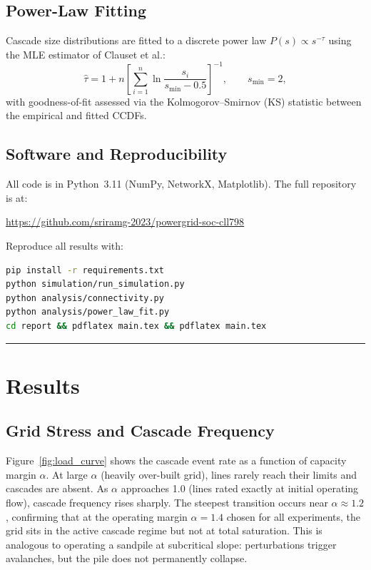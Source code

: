 \documentclass[12pt,a4paper]{article}
\begin{document}
\subsection{Power-Law Fitting}

Cascade size distributions are fitted to a discrete power law
$P(s) \propto s^{-\tau}$ using the MLE estimator of Clauset et al.:
\begin{equation}
    \hat{\tau} = 1 + n \left[
    \sum_{i=1}^{n} \ln \frac{s_i}{s_\text{min} - 0.5}
    \right]^{-1}, \qquad s_\text{min} = 2,
    \label{eq:mle}
\end{equation}
with goodness-of-fit assessed via the Kolmogorov--Smirnov (KS)
statistic between the empirical and fitted CCDFs.

\subsection{Software and Reproducibility}

All code is in Python~3.11 (NumPy, NetworkX, Matplotlib). The full
repository is at:
\begin{center}
\url{https://github.com/sriramg-2023/powergrid-soc-cll798}
\end{center}
Reproduce all results with:
\begin{lstlisting}[language=bash, numbers=none]
pip install -r requirements.txt
python simulation/run_simulation.py
python analysis/connectivity.py
python analysis/power_law_fit.py
cd report && pdflatex main.tex && pdflatex main.tex
\end{lstlisting}

\vspace{1em}
\hrule

\section{Results}
\label{sec:results}

\subsection{Grid Stress and Cascade Frequency}

Figure~\ref{fig:load_curve} shows the cascade event rate as a function
of capacity margin $\alpha$. At large $\alpha$ (heavily over-built
grid), lines rarely reach their limits and cascades are absent. As
$\alpha$ approaches 1.0 (lines rated exactly at initial operating
flow), cascade frequency rises sharply. The steepest transition occurs
near $\alpha \approx 1.2$, confirming that at the operating margin
$\alpha = 1.4$ chosen for all experiments, the grid sits in the active
cascade regime but not at total saturation. This is analogous to
operating a sandpile at subcritical slope: perturbations trigger
avalanches, but the pile does not permanently collapse.
\end{document}
